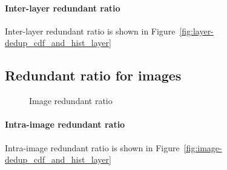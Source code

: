 \paragraph{Inter-layer redundant ratio} Inter-layer redundant ratio is shown in Figure~\ref{fig:layer-dedup_cdf_and_hist_layer}

\subsection{Redundant ratio for images}

\begin{figure}
	\centering
	\caption{Image redundant ratio}
	\label{fig:image-dedup-ratio}
\end{figure}
\paragraph{Intra-image redundant ratio} Intra-image redundant ratio is shown in Figure~\ref{fig:image-dedup_cdf_and_hist_layer}

